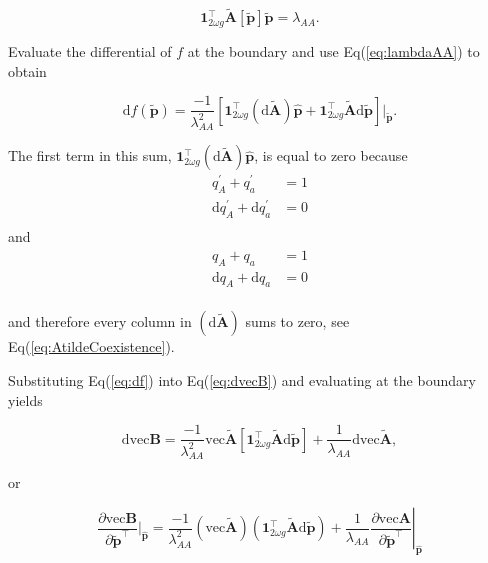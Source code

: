 \documentclass[11pt]{article}
\def\mbf#1{\mathbf{#1}}
\begin{document}
\begin{equation} \label{eq:lambdaAA}
	\mbf{1}^{\intercal}_{2 \omega g} \tilde{\mbf{A}}[\tilde{\mbf{p}}] \tilde{\mbf{p}} = \lambda_{AA}.
\end{equation}

Evaluate the differential of $f$ at the boundary and use Eq(\ref{eq:lambdaAA}) to obtain

\begin{equation} \label{eq:df}
	\text{d} f(\tilde{\mbf{p}}) = \frac{ -1 }{\lambda_{AA}^2 } \left[ \mbf{1}^{\intercal}_{2 \omega g} \left( \text{d} \tilde{\mbf{A}} \right) \hat{\mbf{p}} + \mbf{1}^{\intercal}_{2 \omega g} \tilde{\mbf{A}} \text{d} \tilde{\mbf{p}} \right] \bigg\rvert_{\tilde{\mbf{p}}}.
\end{equation}

The first term in this sum, $\mbf{1}^{\intercal}_{2 \omega g} \left( \text{d} \tilde{\mbf{A}} \right) \hat{\mbf{p}}$, is equal to zero because
\begin{align*}
	q^{\prime}_A + q^{\prime}_a &= 1 \\
	\text{d}q^{\prime}_A + \text{d}q^{\prime}_a &= 0 \\
\end{align*}
\noindent and
\begin{align*}
	q_A + q_a &= 1 \\
	\text{d}q_A + \text{d}q_a &= 0 \\
\end{align*}

\noindent and therefore every column in $\left( \text{d} \tilde{\mbf{A}} \right)$ sums to zero, see Eq(\ref{eq:AtildeCoexistence}).

Substituting Eq(\ref{eq:df}) into Eq(\ref{eq:dvecB}) and evaluating at the boundary yields

\begin{equation} \label{eq:dvecBsubs}
	\text{dvec} \mbf{B} = \frac{ -1 }{\lambda_{AA}^2 } \text{vec} \tilde{\mbf{A}} \left[ \mbf{1}^{\intercal}_{2 \omega g} \tilde{\mbf{A}} \text{d} \tilde{\mbf{p}} \right] + \frac{ 1 }{\lambda_{AA} } \text{dvec} \tilde{\mbf{A}},
\end{equation}

\noindent or 

\begin{equation}
	\frac{\partial \text{vec} \mbf{B}} {\partial \tilde{\mbf{p}}^{\intercal}} \bigg\rvert_{\hat{\mbf{p}}} = \frac{ -1 }{\lambda_{AA}^2 } \left( \text{vec} \tilde{\mbf{A}} \right) \left( \mbf{1}^{\intercal}_{2 \omega g} \tilde{\mbf{A}} \text{d} \tilde{\mbf{p}} \right) + \frac{ 1 }{\lambda_{AA} } \left. \frac{\partial \text{vec} \mbf{A}} {\partial \tilde{\mbf{p}}^{\intercal}} \right|_{\hat{\mbf{p}}}
\end{equation}
\end{document}
